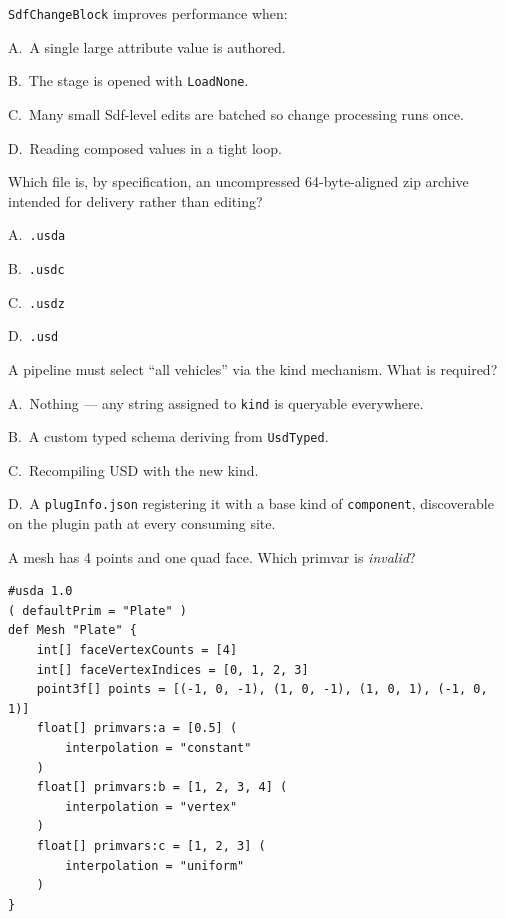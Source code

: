 \texttt{SdfChangeBlock} improves performance when:
\begin{Choices}
  \item A.\ A single large attribute value is authored.
  \item B.\ The stage is opened with \texttt{LoadNone}.
  \item C.\ Many small Sdf-level edits are batched so change processing runs once.
  \item D.\ Reading composed values in a tight loop.
\end{Choices}

Which file is, by specification, an uncompressed 64-byte-aligned zip
archive intended for delivery rather than editing?
\begin{Choices}
  \item A.\ \texttt{.usda}
  \item B.\ \texttt{.usdc}
  \item C.\ \texttt{.usdz}
  \item D.\ \texttt{.usd}
\end{Choices}

A pipeline must select ``all vehicles'' via the kind mechanism. What is
required?
\begin{Choices}
  \item A.\ Nothing --- any string assigned to \texttt{kind} is queryable everywhere.
  \item B.\ A custom typed schema deriving from \texttt{UsdTyped}.
  \item C.\ Recompiling USD with the new kind.
  \item D.\ A \texttt{plugInfo.json} registering it with a base kind of
        \texttt{component}, discoverable on the plugin path at every
        consuming site.
\end{Choices}

A mesh has 4 points and one quad face. Which primvar is \emph{invalid}?

\begin{lstlisting}
#usda 1.0
( defaultPrim = "Plate" )
def Mesh "Plate" {
    int[] faceVertexCounts = [4]
    int[] faceVertexIndices = [0, 1, 2, 3]
    point3f[] points = [(-1, 0, -1), (1, 0, -1), (1, 0, 1), (-1, 0, 1)]
    float[] primvars:a = [0.5] (
        interpolation = "constant"
    )
    float[] primvars:b = [1, 2, 3, 4] (
        interpolation = "vertex"
    )
    float[] primvars:c = [1, 2, 3] (
        interpolation = "uniform"
    )
}
\end{lstlisting}

